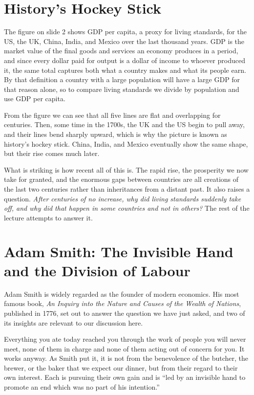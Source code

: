 \documentclass[11pt]{article}
\begin{document}

\section{History's Hockey Stick}

The figure on slide 2 shows GDP per capita, a proxy for living standards, for the US, the UK, China, India, and Mexico over the last thousand years. GDP is the market value of the final goods and services an economy produces in a period, and since every dollar paid for output is a dollar of income to whoever produced it, the same total captures both what a country makes and what its people earn. By that definition a country with a large population will have a large GDP for that reason alone, so to compare living standards we divide by population and use GDP per capita.

From the figure we can see that all five lines are flat and overlapping for centuries. Then, some time in the 1700s, the UK and the US begin to pull away, and their lines bend sharply upward, which is why the picture is known as history's hockey stick. China, India, and Mexico eventually show the same shape, but their rise comes much later.

What is striking is how recent all of this is. The rapid rise, the prosperity we now take for granted, and the enormous gaps between countries are all creations of the last two centuries rather than inheritances from a distant past. It also raises a question. \emph{After centuries of no increase, why did living standards suddenly take off, and why did that happen in some countries and not in others?} The rest of the lecture attempts to answer it.

\section{Adam Smith: The Invisible Hand and the Division of Labour}

Adam Smith is widely regarded as the founder of modern economics. His most famous book, \emph{An Inquiry into the Nature and Causes of the Wealth of Nations}, published in 1776, set out to answer the question we have just asked, and two of its insights are relevant to our discussion here.

 Everything you ate today reached you through the work of people you will never meet, none of them in charge and none of them acting out of concern for you. It works anyway. As Smith put it, it is not from the benevolence of the butcher, the brewer, or the baker that we expect our dinner, but from their regard to their own interest. Each is pursuing their own gain and is ``led by an invisible hand to promote an end which was no part of his intention.''
\end{document}
